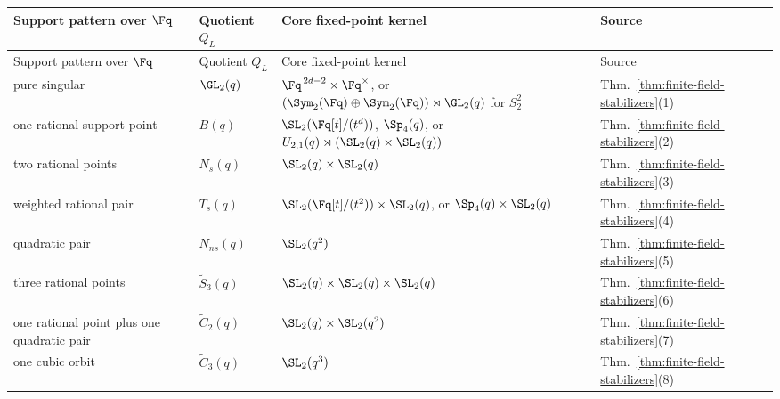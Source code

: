 \begin{longtable}{@{}L{0.25\textwidth} L{0.20\textwidth} L{0.37\textwidth} L{0.12\textwidth}@{}}
\toprule
Support pattern over \(\Fq\) & Quotient \(Q_L\) & Core fixed-point kernel & Source \\
\midrule
\endfirsthead
\toprule
Support pattern over \(\Fq\) & Quotient \(Q_L\) & Core fixed-point kernel & Source \\
\midrule
\endhead
\bottomrule
\endlastfoot
pure singular &
\(\GL_2(q)\) &
\(\Fq^{\,2d-2}\rtimes \Fq^\times\), or
\((\Sym_2(\Fq)\oplus \Sym_2(\Fq))\rtimes \GL_2(q)\) for \(S_2^2\) &
Thm.~\ref{thm:finite-field-stabilizers}(1) \\
one rational support point &
\(B(q)\) &
\(\SL_2(\Fq[t]/(t^d))\), \(\Sp_4(q)\), or
\(U_{2,1}(q)\rtimes (\SL_2(q)\times \SL_2(q))\) &
Thm.~\ref{thm:finite-field-stabilizers}(2) \\
two rational points &
\(N_s(q)\) &
\(\SL_2(q)\times \SL_2(q)\) &
Thm.~\ref{thm:finite-field-stabilizers}(3) \\
weighted rational pair &
\(T_s(q)\) &
\(\SL_2(\Fq[t]/(t^2))\times \SL_2(q)\), or
\(\Sp_4(q)\times \SL_2(q)\) &
Thm.~\ref{thm:finite-field-stabilizers}(4) \\
quadratic pair &
\(N_{ns}(q)\) &
\(\SL_2(q^2)\) &
Thm.~\ref{thm:finite-field-stabilizers}(5) \\
three rational points &
\(\widetilde{S}_3(q)\) &
\(\SL_2(q)\times \SL_2(q)\times \SL_2(q)\) &
Thm.~\ref{thm:finite-field-stabilizers}(6) \\
one rational point plus one quadratic pair &
\(\widetilde{C}_2(q)\) &
\(\SL_2(q)\times \SL_2(q^2)\) &
Thm.~\ref{thm:finite-field-stabilizers}(7) \\
one cubic orbit &
\(\widetilde{C}_3(q)\) &
\(\SL_2(q^3)\) &
Thm.~\ref{thm:finite-field-stabilizers}(8) \\
\end{longtable}
